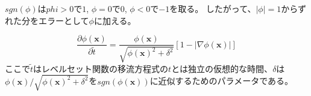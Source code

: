 $sgn(\phi)$は$phi>0$で$1$, $\phi=0$で$0$, $\phi<0$で$-1$を取る。
したがって、$|\phi|=1$からずれた分をエラーとして$\phi$に加える。

\begin{equation}
\label{levelset-reinitialization}
	\frac{\partial \phi (\bm{x})}{\partial \tilde{t}} = \frac{\phi (\bm{x})}{\sqrt{\phi(\bm{x})^2 + \delta^2}}[1-|\nabla \phi (\bm{x})|]
\end{equation}
ここで$\tilde{t}$はレベルセット関数の移流方程式の$t$とは独立の仮想的な時間、$\delta$は$\phi(\bm{x})/\sqrt{\phi(\bm{x})^2+\delta^2}$を$sgn(\phi(\bm{x}))$に近似するためのパラメータである。

\begin{comment}
\subsubsection{保存型レベルセット関数の再初期化}
Olssonらによって提案されたConservative Levelset Method(CLSM)\cite{Olsson2005}, \cite{Olsson2007}。
有限要素法に基づいた定式化までされている文献\cite{Pimenta2018}。
保存型レベルセット関数は界面が厚い場合、界面の余計な動きが生じる。\cite{Takeuchi2018}
CLS関数は$\epsilon$が0に近づく極限ではVOF関数Cに一致する。\cite{Nakazawa2023}

CLSMでは符号付距離関数を正規化されたヘビサイド関数とすることで保存性の問題を解決する
\begin{equation}
\label{CLSM-heaviside}
	\phi(\bm{x}) = \frac{1}{1+e^{d(\bm{x})/\epsilon}}
\end{equation}
ここで$d(\bm{x})$は符号付距離関数、$\epsilon$は振動を回避するためにスムージングする半径、インターフェース厚さとも呼ばれる。

以下の式を解くことでヘビサイド関数の性質を保たせる。\cite{Olsson2007}
\begin{equation}
\label{CLSM-reinitialization}
	\frac{\partial \phi}{\partial \tau} + \nabla \cdot [\phi(1-\phi)\bm{n}_{\Gamma}] = \epsilon \nabla \cdot [\bm{n}_{\Gamma}(\nabla \phi \cdot \bm{n}_{\Gamma})]
\end{equation}
ここで$\bm{n}_{\Gamma}$はインターフェース$\Gamma$における単位法線ベクトルで、重要なのはこれは再初期化の間で変わらない。
\begin{equation}
\label{CLSM-n}
	\bm{n}_{\Gamma} = \frac{\nabla \phi (\bm{x}, \tau_0)}{|\nabla \phi (\bm{x}, \tau_0)|}
\end{equation}

式(\ref{CLSM-reinitialization})を弱形式で表すと、
\begin{equation}
\label{CLSM-weakform}
	\int_{\Omega} v \frac{\phi_c^{k+1}-\phi_c^k}{\Delta \tau} \mathrm{d} x-\int_{\Omega}\left(\frac{\phi_c^k+\phi_c^{k+1}}{2}-\phi_c^{k+1} \phi_c^k\right) \nabla v \cdot \hat{n}_*^{n+1}-\varepsilon \nabla\left(\frac{\phi_c^k+\phi_c^{k+1}}{2}\right) \cdot \hat{n}_*^{n+1}\left(\nabla v \cdot \hat{n}_*^{n+1}\right) \mathrm{d} x=0
\end{equation}


\end{comment}
